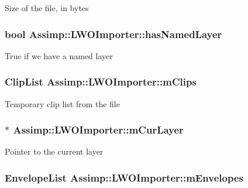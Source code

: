 Size of the file, in bytes \hypertarget{class_assimp_1_1_l_w_o_importer_ac742f8720adcaac0e1355f9d1cfe847c}{
\subsubsection[{has\+Named\+Layer}]{\setlength{\rightskip}{0pt plus 5cm}bool Assimp\+::\+L\+W\+O\+Importer\+::has\+Named\+Layer\hspace{0.3cm}{\ttfamily [protected]}}}\label{class_assimp_1_1_l_w_o_importer_ac742f8720adcaac0e1355f9d1cfe847c}
True if we have a named layer \hypertarget{class_assimp_1_1_l_w_o_importer_acf34094d88a0687d50b8bb3b29daedc3}{
\subsubsection[{m\+Clips}]{\setlength{\rightskip}{0pt plus 5cm}Clip\+List Assimp\+::\+L\+W\+O\+Importer\+::m\+Clips\hspace{0.3cm}{\ttfamily [protected]}}}\label{class_assimp_1_1_l_w_o_importer_acf34094d88a0687d50b8bb3b29daedc3}
Temporary clip list from the file \hypertarget{class_assimp_1_1_l_w_o_importer_a374ca57f0bcdb7b2c8531aec4880b92a}{
\subsubsection[{m\+Cur\+Layer}]{$\ast$ Assimp\+::\+L\+W\+O\+Importer\+::m\+Cur\+Layer\hspace{0.3cm}{\ttfamily [protected]}}}\label{class_assimp_1_1_l_w_o_importer_a374ca57f0bcdb7b2c8531aec4880b92a}
Pointer to the current layer \hypertarget{class_assimp_1_1_l_w_o_importer_aa70735485e64f3d1464ed59a1fd66599}{
\subsubsection[{m\+Envelopes}]{\setlength{\rightskip}{0pt plus 5cm}Envelope\+List Assimp\+::\+L\+W\+O\+Importer\+::m\+Envelopes\hspace{0.3cm}{\ttfamily [protected]}}}\label{class_assimp_1_1_l_w_o_importer_aa70735485e64f3d1464ed59a1fd66599}

